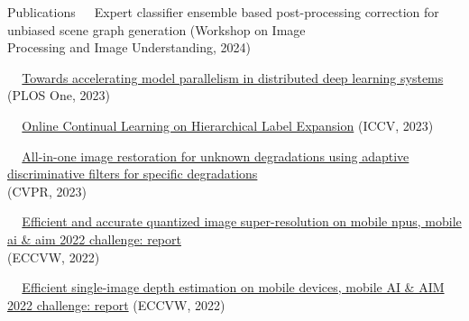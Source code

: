\documentclass{resume} %
\newcommand{\mycolor}[1]{\textcolor{myurlcolor}{#1}}
\begin{document}
\begin{rSection}{Publications}
\textbullet~\,\, {\mycolor{Expert classifier ensemble based post-processing correction for unbiased scene graph generation}} (Workshop on Image 
\\ \hspace*{1.5em}Processing and Image Understanding, 2024)
\\  



\textbullet~\,\, \href{https://journals.plos.org/plosone/article?id=10.1371/journal.pone.0293338}{Towards accelerating model parallelism in distributed deep learning systems} (PLOS One, 2023)
\\ 


\textbullet~\,\, \href{https://ieeexplore.ieee.org/document/10377260}{Online Continual Learning on Hierarchical Label Expansion} (ICCV, 2023)
\\  


\textbullet~\,\, \href{https://ieeexplore.ieee.org/document/10204770}{All-in-one image restoration for unknown degradations using adaptive discriminative filters for specific degradations}
\\ \hspace*{1.5em}(CVPR, 2023)
\\ 


\textbullet~\,\, \href{https://link.springer.com/chapter/10.1007/978-3-031-25066-8_4}{Efficient and accurate quantized image super-resolution on mobile npus, mobile ai \& aim 2022 challenge: report
} 
\\ \hspace*{1.5em}(ECCVW, 2022)
\\ 


\textbullet~\,\, \href{https://link.springer.com/chapter/10.1007/978-3-031-25066-8_4}{Efficient single-image depth estimation on mobile devices, mobile AI \& AIM 2022 challenge: report} (ECCVW, 2022)
\\  






\end{rSection}
\end{document}
